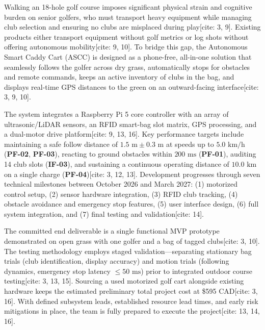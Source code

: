 
Walking an 18-hole golf course imposes significant physical strain and cognitive burden on senior golfers, who must transport heavy equipment while managing club selection and ensuring no clubs are misplaced during play[cite: 3, 9]. Existing products either transport equipment without golf metrics or log shots without offering autonomous mobility[cite: 9, 10]. To bridge this gap, the Autonomous Smart Caddy Cart (ASCC) is designed as a phone-free, all-in-one solution that seamlessly follows the golfer across dry grass, automatically stops for obstacles and remote commands, keeps an active inventory of clubs in the bag, and displays real-time GPS distances to the green on an outward-facing interface[cite: 3, 9, 10].

The system integrates a Raspberry Pi 5 core controller with an array of ultrasonic/LiDAR sensors, an RFID smart-bag slot matrix, GPS processing, and a dual-motor drive platform[cite: 9, 13, 16]. Key performance targets include maintaining a safe follow distance of $1.5\text{ m} \pm 0.3\text{ m}$ at speeds up to $5.0\text{ km/h}$ (\textbf{PF-02}, \textbf{PF-03}), reacting to ground obstacles within $200\text{ ms}$ (\textbf{PF-01}), auditing 14 club slots (\textbf{IF-03}), and sustaining a continuous operating distance of $10.0\text{ km}$ on a single charge (\textbf{PF-04})[cite: 3, 12, 13]. Development progresses through seven technical milestones between October 2026 and March 2027: (1) motorized control setup, (2) sensor hardware integration, (3) RFID club tracking, (4) obstacle avoidance and emergency stop features, (5) user interface design, (6) full system integration, and (7) final testing and validation[cite: 14].

The committed end deliverable is a single functional MVP prototype demonstrated on open grass with one golfer and a bag of tagged clubs[cite: 3, 10]. The testing methodology employs staged validation—separating stationary bag trials (club identification, display accuracy) and motion trials (following dynamics, emergency stop latency $\le 50\text{ ms}$) prior to integrated outdoor course testing[cite: 3, 13, 15]. Sourcing a used motorized golf cart alongside existing hardware keeps the estimated preliminary total project cost at \$595 CAD[cite: 3, 16]. With defined subsystem leads, established resource lead times, and early risk mitigations in place, the team is fully prepared to execute the project[cite: 13, 14, 16].
\clearpage